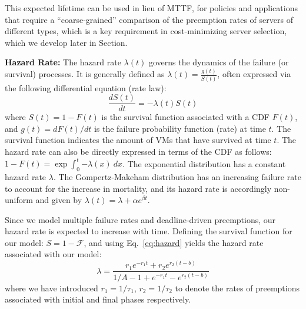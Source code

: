 This expected lifetime can be used in lieu of MTTF, for policies and applications that require a ``coarse-grained'' comparison of the preemption rates of servers of different types, which is a key requirement in cost-minimizing server selection, which we develop later in Section. 


\noindent \textbf{Hazard Rate:}
The hazard rate $\lambda(t)$ governs the dynamics of the failure (or survival) processes. It is generally defined as $\lambda(t) = \frac{g(t)}{S(t)}$, often expressed via the following differential equation (rate law):
\begin{equation}\label{eq:hazard}
\frac{dS(t)}{dt} = -\lambda(t) S(t)
\end{equation}
where $S(t) = 1 - F(t)$ is the survival function associated with a CDF $F(t)$, and $g(t)=dF(t)/dt$ is the failure probability function (rate) at time $t$. The survival function indicates the amount of VMs that have survived at time $t$.
The hazard rate can also be directly expressed in terms of the CDF as follows: $1-F(t) = \exp{\int_0^t{-\lambda(x) ~dx}}$. 
The exponential distribution has a constant hazard rate $\lambda$.
The Gompertz-Makeham distribution has an increasing failure rate to account for the increase in mortality, and its hazard rate is accordingly non-uniform and given by $\lambda(t) = \lambda + \alpha e^{\beta t}$.

Since we model multiple failure rates and deadline-driven preemptions, our hazard rate is expected to increase with time. Defining the survival function for our model: $S = 1 - \mathscr{F}$, and using Eq.~\ref{eq:hazard} yields the hazard rate associated with our model: 
\noindent 
\begin{equation}
  \label{eq:hmodel}
  \lambda %
  = \dfrac{r_1 e^{- r_1 t} + r_2 e^{r_2 (t - b)}}{1/A - 1 + e^{- r_1 t} - e^{r_2 (t - b)}}
\end{equation}
where we have introduced $r_1 = 1/\tau_1$, $r_2 = 1/\tau_2$ to denote the rates of preemptions associated with initial and final phases respectively.

